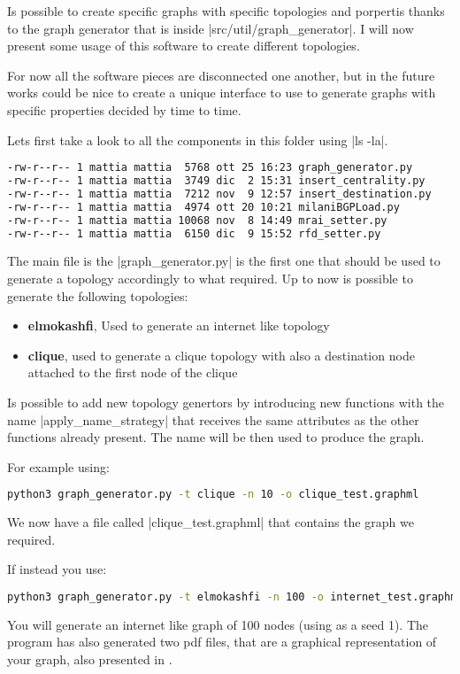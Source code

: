 \documentclass[10pt,journal,onecolumn]{IEEEtran}
\begin{document}
Is possible to create specific graphs with specific topologies and porpertis
thanks to the graph generator that is inside |src/util/graph_generator|.
I will now present some usage of this software to create different topologies.

For now all the software pieces are disconnected one another, but in the future
works could be nice to create a unique interface to use to generate graphs
with specific properties decided by time to time.

Lets first take a look to all the components in this folder using |ls -la|.
\begin{lstlisting}[language=bash]
-rw-r--r-- 1 mattia mattia  5768 ott 25 16:23 graph_generator.py
-rw-r--r-- 1 mattia mattia  3749 dic  2 15:31 insert_centrality.py
-rw-r--r-- 1 mattia mattia  7212 nov  9 12:57 insert_destination.py
-rw-r--r-- 1 mattia mattia  4974 ott 20 10:21 milaniBGPLoad.py
-rw-r--r-- 1 mattia mattia 10068 nov  8 14:49 mrai_setter.py
-rw-r--r-- 1 mattia mattia  6150 dic  9 15:52 rfd_setter.py
\end{lstlisting}

The main file is the |graph_generator.py| is the first one that should
be used to generate a topology accordingly to what required.
Up to now is possible to generate the following topologies:
\begin{itemize}
		\item \textbf{elmokashfi}, Used to generate an internet like topology
		\item \textbf{clique}, used to generate a clique topology with also
			a destination node attached to the first node of the clique
\end{itemize}
Is possible to add new topology genertors by introducing new functions with
the name |apply_{name}_strategy| that receives the same attributes as the other
functions already present.
The name will be then used to produce the graph.

For example using:
\begin{lstlisting}[language=bash]
python3 graph_generator.py -t clique -n 10 -o clique_test.graphml
\end{lstlisting}
We now have a file called |clique_test.graphml| that contains the graph we required.

If instead you use:
\begin{lstlisting}[language=bash]
python3 graph_generator.py -t elmokashfi -n 100 -o internet_test.graphml -s 1
\end{lstlisting}
You will generate an internet like graph of 100 nodes (using as a seed 1).
The program has also generated two pdf files, that are a graphical representation
of your graph, also presented in .
\end{document}
